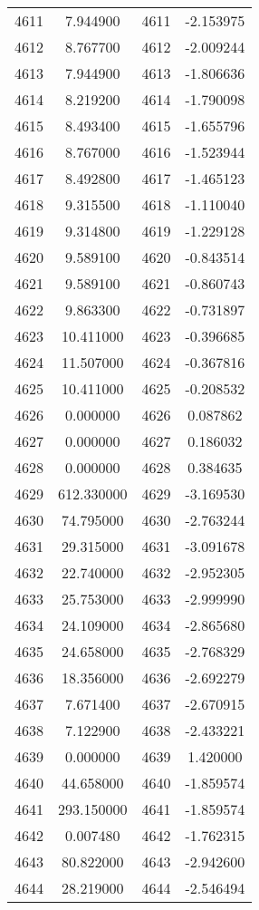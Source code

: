 \documentclass[12pt]{article}
\begin{document}
\begin{longtable}{@{}cccc@{}}
4611 & 7.944900 & 4611 & -2.153975 \\
4612 & 8.767700 & 4612 & -2.009244 \\
4613 & 7.944900 & 4613 & -1.806636 \\
4614 & 8.219200 & 4614 & -1.790098 \\
4615 & 8.493400 & 4615 & -1.655796 \\
4616 & 8.767000 & 4616 & -1.523944 \\
4617 & 8.492800 & 4617 & -1.465123 \\
4618 & 9.315500 & 4618 & -1.110040 \\
4619 & 9.314800 & 4619 & -1.229128 \\
4620 & 9.589100 & 4620 & -0.843514 \\
4621 & 9.589100 & 4621 & -0.860743 \\
4622 & 9.863300 & 4622 & -0.731897 \\
4623 & 10.411000 & 4623 & -0.396685 \\
4624 & 11.507000 & 4624 & -0.367816 \\
4625 & 10.411000 & 4625 & -0.208532 \\
4626 & 0.000000 & 4626 & 0.087862 \\
4627 & 0.000000 & 4627 & 0.186032 \\
4628 & 0.000000 & 4628 & 0.384635 \\
4629 & 612.330000 & 4629 & -3.169530 \\
4630 & 74.795000 & 4630 & -2.763244 \\
4631 & 29.315000 & 4631 & -3.091678 \\
4632 & 22.740000 & 4632 & -2.952305 \\
4633 & 25.753000 & 4633 & -2.999990 \\
4634 & 24.109000 & 4634 & -2.865680 \\
4635 & 24.658000 & 4635 & -2.768329 \\
4636 & 18.356000 & 4636 & -2.692279 \\
4637 & 7.671400 & 4637 & -2.670915 \\
4638 & 7.122900 & 4638 & -2.433221 \\
4639 & 0.000000 & 4639 & 1.420000 \\
4640 & 44.658000 & 4640 & -1.859574 \\
4641 & 293.150000 & 4641 & -1.859574 \\
4642 & 0.007480 & 4642 & -1.762315 \\
4643 & 80.822000 & 4643 & -2.942600 \\
4644 & 28.219000 & 4644 & -2.546494 \\

\end{longtable}
\end{document}
